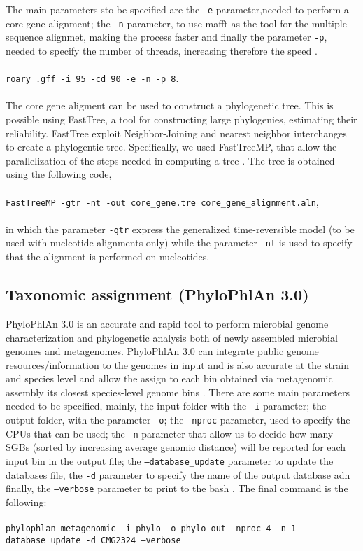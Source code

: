 \documentclass[a4paper,titlepage, oneside]{book}
\newcommand{\code}[1]{\colorbox{light-gray}{\texttt{#1}}}
\begin{document}
The main parameters sto be specified are the \code{-e} parameter,needed to perform a core gene alignment; the \code{-n} parameter, to use mafft as the tool for the multiple sequence alignmet, making the process faster and finally the parameter \code{-p}, needed to specify the number of threads, increasing therefore the speed \cite{Roary}.
\\
\newline
\\
\code{roary .gff -i 95 -cd 90 -e -n -p 8}.
\\
\newline
\\
The core gene aligment can be used to construct a phylogenetic tree. This is possible using FastTree, a tool for constructing large phylogenies, estimating their reliability. FastTree exploit Neighbor-Joining and nearest neighbor interchanges to create a phylogentic tree. \cite{FastTree}
Specifically, we used FastTreeMP, that allow the parallelization of the steps needed in computing a tree \cite{FTMP}.
The tree is obtained using the following code,\\ \newline \\ \code{FastTreeMP -gtr -nt -out core\_gene.tre core\_gene\_alignment.aln},\\ \newline \\ in which the parameter \code{-gtr} express the generalized time-reversible model (to be used with nucleotide alignments only) while the parameter \code{-nt} is used to specify that the alignment is performed on nucleotides.




\subsection{Taxonomic assignment (PhyloPhlAn 3.0)}

PhyloPhlAn 3.0 is an accurate and rapid tool to perform microbial genome characterization and phylogenetic analysis both of newly assembled microbial genomes and metagenomes. PhyloPhlAn 3.0 can integrate public genome resources/information to the genomes in input and is also accurate at the strain and species level and allow the assign to each bin obtained via metagenomic assembly its closest species-level genome bins \cite{Phylo}.
There are some main parameters needed to be specified, mainly, the input folder with the \code{-i} parameter; the output folder, with the parameter \code{-o}; the \code{--nproc} parameter, used to specify the CPUs that can be used; the \code{-n} parameter that allow us to decide  how many SGBs (sorted by increasing average genomic distance) will be reported for each input bin in the output file; the \code{--database\_update} parameter to update the databases file, the \code{-d} parameter to specify the name of the output database adn finally, the \code{--verbose} parameter to print to the bash \cite{PhyloGuide}.
The final command is the following:\\ \newline \\ \code{phylophlan\_metagenomic -i phylo -o phylo\_out --nproc 4 -n 1 --database\_update -d CMG2324 --verbose}
\end{document}
